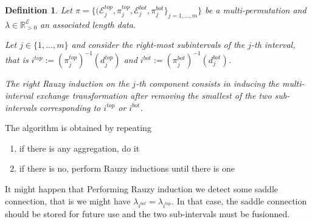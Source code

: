 \documentclass{article}
\def\RR{\mathbb{R}}
\def\cE{\mathcal{E}}
\newtheorem{definition}{Definition}
\begin{document}
\begin{definition}
Let
$\pi = \{(\cE^{top}_j, \pi^{top}_j, \cE^{bot}_j, \pi^{bot}_j\}_{j=1,\ldots,m}\}$
be a multi-permutation and $\lambda \in \RR_{>0}^{\cE}$ an associated
length data.

Let $j \in \{1,\ldots,m\}$ and consider the right-most subintervals of
the $j$-th interval, that is $i^{top} := (\pi^{top}_j)^{-1}(d_j^{top})$
and $i^{bot} := (\pi^{bot}_j)^{-1}(d_j^{bot})$.

The \emph{right Rauzy induction on the $j$-th component} consists in inducing
the multi-interval exchange transformation after removing the smallest of
the two sub-intervals corresponding to $i^{top}$ or $i^{bot}$.
\end{definition}


The algorithm is obtained by repeating
\begin{enumerate}
\item if there is any aggregation, do it
\item if there is no, perform Rauzy inductions until there is one
\end{enumerate}

It might happen that Performing Rauzy induction we detect some saddle connection,
that is we might have $\lambda_{i^{bot}} = \lambda_{i^{top}}$. In that case, the
saddle connection should be stored for future use and the two sub-intervals must be
fusionned.
\end{document}
